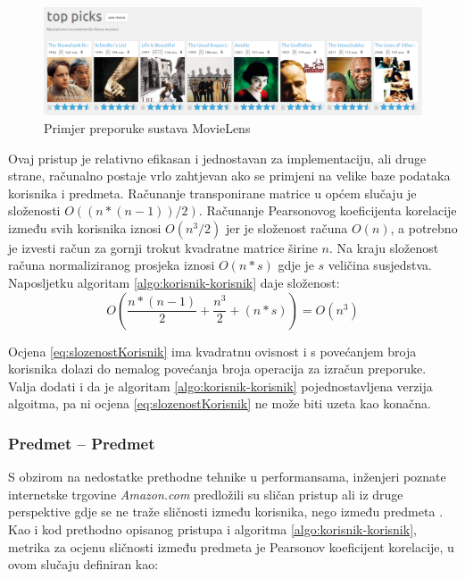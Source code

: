 \documentclass[times, utf8, diplomski, numeric]{fer}
\begin{document}
\begin{figure}[!htb]
	\centering
	\includegraphics[width=14.21cm]{images/collaborative/movielens.png}
	\caption{Primjer preporuke sustava \glqq MovieLens\grqq}
	\label{fig:movielens}
\end{figure}

Ovaj pristup je relativno efikasan i jednostavan za implementaciju, ali druge
strane, računalno postaje vrlo zahtjevan ako se primjeni na velike baze podataka
korisnika i predmeta. Računanje transponirane matrice u općem slučaju je
složenosti $O((n \ast (n-1)) / 2)$. Računanje Pearsonovog koeficijenta korelacije
između svih korisnika iznosi $O(n^3 / 2)$ jer je složenost računa $O(n)$, a
potrebno je izvesti račun za gornji trokut kvadratne matrice širine $n$. Na
kraju složenost računa normaliziranog prosjeka iznosi $O(n * s)$ gdje je $s$
veličina susjedstva. Naposljetku algoritam \ref{algo:korisnik-korisnik} daje
složenost:
\begin{equation}
\label{eq:slozenostKorisnik}
	O(
		\frac{n \ast (n-1)}{2} + 
		\frac{n^3}{2} + 
		(n \ast s)
	) = O(n^3)
\end{equation}

Ocjena \ref{eq:slozenostKorisnik} ima kvadratnu ovisnost i s povećanjem broja
korisnika dolazi do nemalog povećanja broja operacija za izračun preporuke. 
Valja dodati i da je algoritam \ref{algo:korisnik-korisnik} pojednostavljena
verzija algoitma, pa ni ocjena \ref{eq:slozenostKorisnik} ne može biti uzeta
kao konačna.

\subsubsection{Predmet -- Predmet}
S obzirom na nedostatke prethodne tehnike u performansama, inženjeri poznate
internetske trgovine \emph{Amazon.com} predložili su sličan pristup ali iz druge
perspektive gdje se ne traže sličnosti između korisnika, nego između predmeta
\cite{amazon}. Kao i kod prethodno opisanog pristupa i algoritma
\ref{algo:korisnik-korisnik}, metrika za ocjenu sličnosti između predmeta je
Pearsonov koeficijent korelacije, u ovom slučaju definiran kao:
\end{document}
